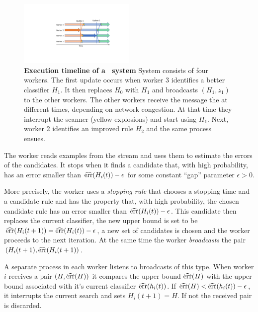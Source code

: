 \begin{figure}[t]
\begin{center}
  \includegraphics[width=0.5\textwidth]{figs/AsyncUpdates.pdf}
\end{center}
  \caption{{\bf Execution timeline of a \tmsn\ system}
      System consists of four workers. The first update occurs when
      worker 3 identifies a better classifier $H_1$. It then replaces
      $H_0$ with $H_1$ and broadcasts $(H_1,z_1)$ to the
    other workers. The other workers receive the message the at different
    times, depending on network congestion. At that time they  interrupt the
    scanner (yellow explosions) and start using $H_1$. Next, worker 2
    identifies an improved rule $H_2$ and the same process ensues.
    \label{fig:async}}
   	\vspace{0pt}
\end{figure}

The worker reads examples from the stream and uses them to estimate
the errors of the candidates. It stops when it finds a candidate that,
with high probability, has an error smaller than
$\widehat{\mbox{err}}(H_i(t))-\epsilon$ for some constant ``gap'' parameter
$\epsilon>0$.

More precisely, the worker uses a {\em stopping rule} that chooses a
stopping time and a candidate rule and has the property that, with
high probability, the chosen candidate rule has an error smaller than
$\widehat{\mbox{err}}(H_i(t))-\epsilon$. This candidate then replaces the current
classifier, the new upper bound is set to be $\widehat{\mbox{err}}(H_i(t+1)) =
\widehat{\mbox{err}}(H_i(t))-\epsilon$, a new set of candidates is chosen and the
worker proceeds to the next iteration. At the same time the worker
{\em broadcasts} the pair $(H_i(t+1), \widehat{\mbox{err}}(H_i(t+1))$.

A separate process in each worker listens to broadcasts of this
type. When worker $i$ receives a pair $(H,\widehat{\mbox{err}}(H))$ it compares the
upper bound $\widehat{\mbox{err}}(H)$ with the upper bound associated with it's
current classifier $\widehat{\mbox{err}}(h_i(t))$. If $\widehat{\mbox{err}}(H) < \widehat{\mbox{err}}(h_i(t))-\epsilon$,
it interrupts the current search and sets $H_i(t+1)=H$. If not the
received pair is discarded.

